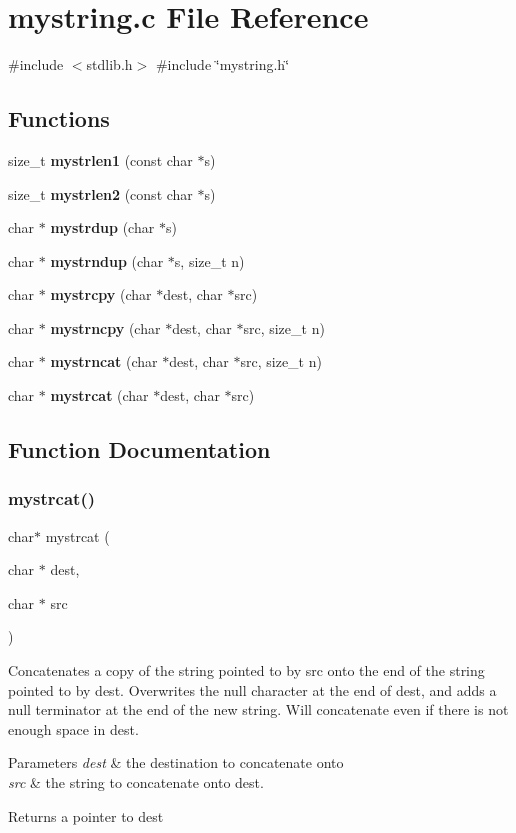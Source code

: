 \section{mystring.\+c File Reference}
\label{mystring_8c}
{\ttfamily \#include $<$stdlib.\+h$>$}\newline
{\ttfamily \#include \char`\"{}mystring.\+h\char`\"{}}\newline
\subsection*{Functions}
\begin{DoxyCompactItemize}
\item 
size\+\_\+t \textbf{ mystrlen1} (const char $\ast$s)
\item 
size\+\_\+t \textbf{ mystrlen2} (const char $\ast$s)
\item 
char $\ast$ \textbf{ mystrdup} (char $\ast$s)
\item 
char $\ast$ \textbf{ mystrndup} (char $\ast$s, size\+\_\+t n)
\item 
char $\ast$ \textbf{ mystrcpy} (char $\ast$dest, char $\ast$src)
\item 
char $\ast$ \textbf{ mystrncpy} (char $\ast$dest, char $\ast$src, size\+\_\+t n)
\item 
char $\ast$ \textbf{ mystrncat} (char $\ast$dest, char $\ast$src, size\+\_\+t n)
\item 
char $\ast$ \textbf{ mystrcat} (char $\ast$dest, char $\ast$src)
\end{DoxyCompactItemize}


\subsection{Function Documentation}
\mbox{\label{mystring_8c_a68e51a014c7210b524d657b665d09db8}} 
\subsubsection{mystrcat()}
{\footnotesize\ttfamily char$\ast$ mystrcat (\begin{DoxyParamCaption}\item[{char $\ast$}]{dest,  }\item[{char $\ast$}]{src }\end{DoxyParamCaption})}

Concatenates a copy of the string pointed to by src onto the end of the string pointed to by dest. Overwrites the null character at the end of dest, and adds a null terminator at the end of the new string. Will concatenate even if there is not enough space in dest. 
\begin{DoxyParams}{Parameters}
{\em dest} & the destination to concatenate onto \\
\hline
{\em src} & the string to concatenate onto dest. \\
\hline
\end{DoxyParams}
\begin{DoxyReturn}{Returns}
a pointer to dest 
\end{DoxyReturn}


